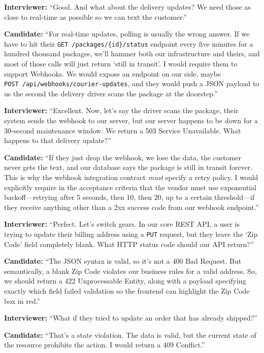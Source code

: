 \documentclass[
  11pt,
  openany,
  oneside]{book}
\begin{document}
\textbf{Interviewer:} ``Good. And what about the delivery updates? We
need those as close to real-time as possible so we can text the
customer.''

\textbf{Candidate:} ``For real-time updates, polling is usually the
wrong answer. If we have to hit their
\texttt{GET\ /packages/\{id\}/status} endpoint every five minutes for a
hundred thousand packages, we'll hammer both our infrastructure and
theirs, and most of those calls will just return `still in transit'. I
would require them to support Webhooks. We would expose an endpoint on
our side, maybe \texttt{POST\ /api/webhooks/courier-updates}, and they
would push a JSON payload to us the second the delivery driver scans the
package at the doorstep.''

\textbf{Interviewer:} ``Excellent. Now, let's say the driver scans the
package, their system sends the webhook to our server, but our server
happens to be down for a 30-second maintenance window. We return a 503
Service Unavailable. What happens to that delivery update?''

\textbf{Candidate:} ``If they just drop the webhook, we lose the data,
the customer never gets the text, and our database says the package is
still in transit forever. This is why the webhook integration contract
\emph{must} specify a retry policy. I would explicitly require in the
acceptance criteria that the vendor must use exponential
backoff---retrying after 5 seconds, then 10, then 20, up to a certain
threshold---if they receive anything other than a 2xx success code from
our webhook endpoint.''

\textbf{Interviewer:} ``Perfect. Let's switch gears. In our core REST
API, a user is trying to update their billing address using a
\texttt{PUT} request, but they leave the `Zip Code' field completely
blank. What HTTP status code should our API return?''

\textbf{Candidate:} ``The JSON syntax is valid, so it's not a 400 Bad
Request. But semantically, a blank Zip Code violates our business rules
for a valid address. So, we should return a 422 Unprocessable Entity,
along with a payload specifying exactly which field failed validation so
the frontend can highlight the Zip Code box in red.''

\textbf{Interviewer:} ``What if they tried to update an order that has
already shipped?''

\textbf{Candidate:} ``That's a state violation. The data is valid, but
the current state of the resource prohibits the action. I would return a
409 Conflict.''
\end{document}
